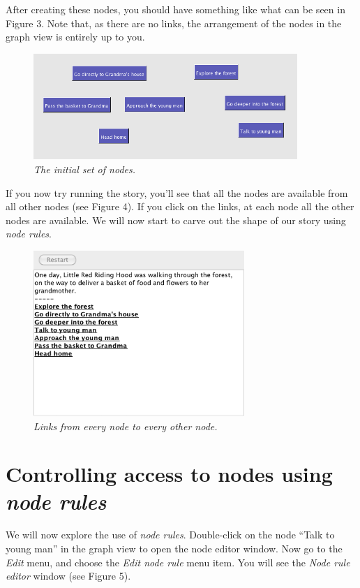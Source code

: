 \documentclass{article}
\begin{document}
After creating these nodes, you should have something like what can be seen in
Figure 3. Note that, as there are no links, the arrangement of the nodes in the
graph view is entirely up to you.

\begin{figure}[h]
  \centering
  \includegraphics[width=10cm]{images/hypedyn-tutorial-3-figure-3}
  \caption{\textit{The initial set of nodes.}}
\end{figure} 

If you now try running the story, you'll see that all the nodes are available
from all other nodes (see Figure 4). If you click on the links, at each node
all the other nodes are available. We will now start to carve out the shape of
our story using \textit{node rules}.

\begin{figure}[h]
  \centering
  \includegraphics[width=8cm]{images/hypedyn-tutorial-3-figure-4}
  \caption{\textit{Links from every node to every other node.}}
\end{figure} 

\section{Controlling access to nodes using \textit{node rules}}

We will now explore the use of \textit{node rules}. Double-click on the node
``Talk to young man'' in the graph view to open the node editor window. Now go
to the \textit{Edit} menu, and choose the \textit{Edit node rule} menu item.
You will see the \textit{Node rule editor} window (see Figure 5).
\end{document}
